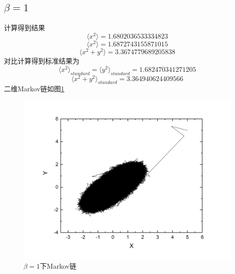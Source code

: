 \documentclass{article}
\begin{document}
	\subsection{$\beta=1$}
计算得到结果
\begin{equation}
	\langle x^2\rangle=1.6802036533334823
\end{equation}
\begin{equation}
	\langle x^2\rangle=1.6872743155871015
\end{equation}
\begin{equation}
	\langle x^2+y^2\rangle=3.3674779689205838 
\end{equation}
对比计算得到标准结果为
\begin{equation}
	\langle x^2\rangle_{standard}=\langle y^2\rangle_{standard}=1.682470341271205
\end{equation}
\begin{equation}
	\langle x^2+ y^2\rangle_{standard}=3.364940624409566
\end{equation}
二维Markov链如图\ref{fig:2}
\begin{figure}[!h]
	
	\centering
	\includegraphics[scale=0.6]{beta1}
	\caption{\heiti{}$ \beta=1 $下Markov链}
	\label{fig:2}
\end{figure}
\end{document}
